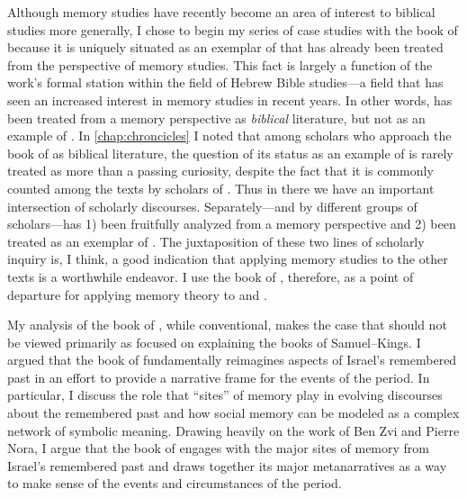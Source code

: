 Although memory studies have recently become an area of interest to biblical studies more generally, I chose to begin my series of case studies with the book of \chronicles because it is uniquely situated as an exemplar of \rwb that has already been treated from the perspective of memory studies. This fact is largely a function of the work's formal station within the field of Hebrew Bible studies---a field that has seen an increased interest in memory studies in recent years. In other words, \chronicles has been treated from a memory perspective as \emph{biblical} literature, but not as an example of \rwb. In \autoref{chap:chroncicles} I noted that among scholars who approach the book of \chronicles as biblical literature, the question of its status as an example of \rwb is rarely treated as more than a passing curiosity, despite the fact that it is commonly counted among the \rwb texts by scholars of \rwb. Thus in \chronicles there we have an important intersection of scholarly discourses. Separately---and by different groups of scholars---\chronicles has 1) been fruitfully analyzed from a memory perspective and 2) been treated as an exemplar of \rwb. The juxtaposition of these two lines of scholarly inquiry is, I think, a good indication that applying memory studies to the other \rwb texts is a worthwhile endeavor. I use the book of \chronicles, therefore, as a point of departure for applying memory theory to \ga and \jub. 

My analysis of the book of \chronicles, while conventional, makes the case that \chronicles should not be viewed primarily as focused on explaining the books of Samuel--Kings. I argued that the book of \chronicles fundamentally reimagines aspects of Israel's remembered past in an effort to provide a narrative frame for the events of the \secondtemple period. In particular, I discuss the role that ``sites'' of memory play in evolving discourses about the remembered past and how social memory can be modeled as a complex network of symbolic meaning.  Drawing heavily on the work of Ben Zvi and Pierre Nora, I argue that the book of \chronicles engages with the major sites of memory from Israel's remembered past and draws together its major metanarratives as a way to make sense of the events and circumstances of the \secondtemple period.

